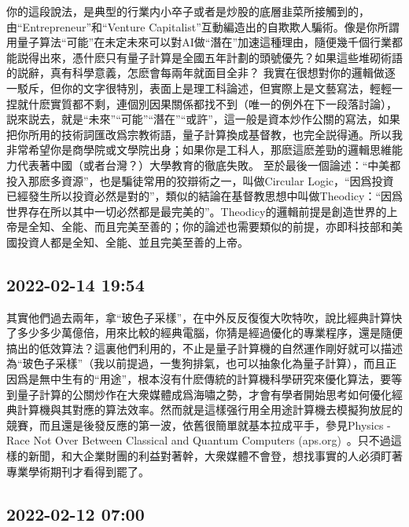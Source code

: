 \documentclass[twocolumn]{ctexart}
\begin{document}
你的這段說法，是典型的行業内小卒子或者是炒股的底層韭菜所接觸到的，由“Entrepreneur”和“Venture Capitalist”互動編造出的自欺欺人騙術。像是你所謂用量子算法“可能”在未定未來可以對AI做“潛在”加速這種理由，隨便幾千個行業都能説得出來，憑什麽只有量子計算是全國五年計劃的頭號優先？如果這些堆砌術語的説辭，真有科學意義，怎麽會每兩年就面目全非？
我實在很想對你的邏輯做逐一駁斥，但你的文字很特別，表面上是理工科論述，但實際上是文藝寫法，輕輕一捏就什麽實質都不剩，連個別因果關係都找不到（唯一的例外在下一段落討論），説來説去，就是“未來”“可能”“潛在”“或許”，這一般是資本炒作公關的寫法，如果把你所用的技術詞匯改爲宗教術語，量子計算換成基督教，也完全説得通。所以我非常希望你是商學院或文學院出身；如果你是工科人，那麽這麽差勁的邏輯思維能力代表著中國（或者台灣？）大學教育的徹底失敗。
至於最後一個論述：“中美都投入那麽多資源”，也是騙徒常用的狡辯術之一，叫做Circular Logic，“因爲投資已經發生所以投資必然是對的”，類似的結論在基督教思想中叫做Theodicy：“因爲世界存在所以其中一切必然都是最完美的”。Theodicy的邏輯前提是創造世界的上帝是全知、全能、而且完美至善的；你的論述也需要類似的前提，亦即科技部和美國投資人都是全知、全能、並且完美至善的上帝。
\subsection*{2022-02-14 19:54}

其實他們過去兩年，拿“玻色子采樣”，在中外反反復復大吹特吹，說比經典計算快了多少多少萬億倍，用來比較的經典電腦，你猜是經過優化的專業程序，還是隨便搞出的低效算法？這裏他們利用的，不止是量子計算機的自然運作剛好就可以描述為“玻色子采樣”（我以前提過，一隻狗排氣，也可以抽象化為量子計算），而且正因爲是無中生有的“用途”，根本沒有什麽傳統的計算機科學研究來優化算法，要等到量子計算的公關炒作在大衆媒體成爲海嘯之勢，才會有學者開始思考如何優化經典計算機與其對應的算法效率。然而就是這樣强行用全用途計算機去模擬狗放屁的競賽，而且還是後發反應的第一波，依舊很簡單就基本拉成平手，參見Physics - Race Not Over Between Classical and Quantum Computers (aps.org) 。只不過這樣的新聞，和大企業財團的利益對著幹，大衆媒體不會登，想找事實的人必須盯著專業學術期刊才看得到罷了。
\subsection*{2022-02-12 07:00}
\end{document}

